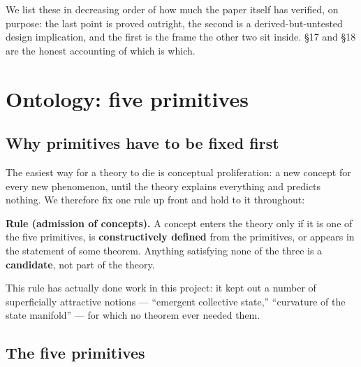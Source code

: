 \documentclass[11pt]{article}
\renewenvironment{quote}
  {\def\FrameCommand{{\color{gray!60}\vrule width 2pt}\hspace{8pt}}%
   \MakeFramed{\advance\hsize-\width \FrameRestore}\begin{itshape}}
  {\end{itshape}\endMakeFramed}
\begin{document}
We list these in decreasing order of how much the paper itself has verified, on purpose: the last point is proved outright, the second is a derived-but-untested design implication, and the first is the frame the other two sit inside. \S{}17 and \S{}18 are the honest accounting of which is which.

\hypertarget{ontology-five-primitives}{%
\section{Ontology: five primitives}\label{ontology-five-primitives}}

\hypertarget{why-primitives-have-to-be-fixed-first}{%
\subsection{Why primitives have to be fixed first}\label{why-primitives-have-to-be-fixed-first}}

The easiest way for a theory to die is conceptual proliferation: a new concept for every new phenomenon, until the theory explains everything and predicts nothing. We therefore fix one rule up front and hold to it throughout:

\begin{quote}
\textbf{Rule (admission of concepts).} A concept enters the theory only if it is one of the five primitives, is \textbf{constructively defined} from the primitives, or appears in the statement of some theorem. Anything satisfying none of the three is a \textbf{candidate}, not part of the theory.
\end{quote}

This rule has actually done work in this project: it kept out a number of superficially attractive notions --- ``emergent collective state,'' ``curvature of the state manifold'' --- for which no theorem ever needed them.

\hypertarget{the-five-primitives}{%
\subsection{The five primitives}\label{the-five-primitives}}
\end{document}
